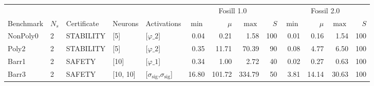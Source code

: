 \begin{tabular}{lllllrrrrrrrr}
    \toprule
              &       &             &          &                                                   & \multicolumn{4}{c}{Fosill 1.0} & \multicolumn{4}{c}{Fossil 2.0}                                                \\
    Benchmark & $N_s$ & Certificate & Neurons  & Activations                                       & $\min$                         & $\mu$                          & $\max$ & $S$ & $\min$ & $\mu$ & $\max$ & $S$ \\

    \midrule
    NonPoly0  & 2     & STABILITY   & [5]      & [$\varphi\_{2}$]                                  & 0.04                           & 0.21                           & 1.58   & 100 & 0.01   & 0.16  & 1.54   & 100 \\
    Poly2     & 2     & STABILITY   & [5]      & [$\varphi\_{2}$]                                  & 0.35                           & 11.71                          & 70.39  & 90  & 0.08   & 4.77  & 6.50   & 100 \\
    Barr1     & 2     & SAFETY      & [10]     & [$\varphi\_{1}$]                                  & 0.34                           & 1.00                           & 2.72   & 40  & 0.02   & 0.27  & 0.63   & 100 \\
    Barr3     & 2     & SAFETY      & [10, 10] & [$\sigma_{\textrm{sig}}$,$\sigma_{\textrm{sig}}$] & 16.80                          & 101.72                         & 334.79 & 50  & 3.81   & 14.14 & 30.63  & 100 \\

    \bottomrule
\end{tabular}
